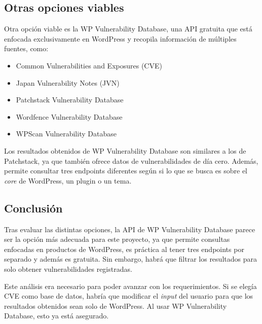\subsection*{Otras opciones viables}
Otra opción viable es la WP Vulnerability Database, una API gratuita que está enfocada exclusivamente en WordPress y recopila información de múltiples fuentes, como:

\begin{itemize}
    \item Common Vulnerabilities and Exposures (CVE)
    \item Japan Vulnerability Notes (JVN)
    \item Patchstack Vulnerability Database
    \item Wordfence Vulnerability Database
    \item WPScan Vulnerability Database
\end{itemize}

Los resultados obtenidos de WP Vulnerability Database son similares a los de Patchstack, ya que también ofrece datos de vulnerabilidades de día cero. Además, permite consultar tres endpoints diferentes según si lo que se busca es sobre el \textit{core} de WordPress, un plugin o un tema.

\subsection*{Conclusión}
Tras evaluar las distintas opciones, la API de WP Vulnerability Database parece ser la opción más adecuada para este proyecto, ya que permite consultas enfocadas en productos de WordPress, es práctica al tener tres endpoints por separado y además es gratuita. Sin embargo, habrá que filtrar los resultados para solo obtener vulnerabilidades registradas.

Este análisis era necesario para poder avanzar con los requerimientos. Si se elegía CVE como base de datos, habría que modificar el \textit{input} del usuario para que los resultados obtenidos sean solo de WordPress. Al usar WP Vulnerability Database, esto ya está asegurado.